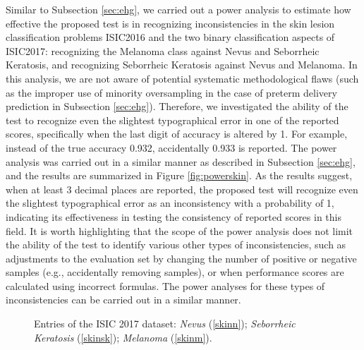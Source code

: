 \documentclass[3p, times]{elsarticle}
\begin{document}
Similar to Subsection \ref{sec:ehg}, we carried out a power analysis to estimate how effective the proposed test is in recognizing inconsistencies in the skin lesion classification problems ISIC2016 and the two binary classification aspects of ISIC2017: recognizing the Melanoma class against Nevus and Seborrheic Keratosis, and recognizing Seborrheic Keratosis against Nevus and Melanoma. In this analysis, we are not aware of potential systematic methodological flaws (such as the improper use of minority oversampling in the case of preterm delivery prediction in Subsection \ref{sec:ehg}). Therefore, we investigated the ability of the test to recognize even the slightest typographical error in one of the reported scores, specifically when the last digit of accuracy is altered by 1. For example, instead of the true accuracy 0.932, accidentally 0.933 is reported. The power analysis was carried out in a similar manner as described in Subsection \ref{sec:ehg}, and the results are summarized in Figure \ref{fig:powerskin}. As the results suggest, when at least 3 decimal places are reported, the proposed test will recognize even the slightest typographical error as an inconsistency with a probability of 1, indicating its effectiveness in testing the consistency of reported scores in this field. It is worth highlighting that the scope of the power analysis does not limit the ability of the test to identify various other types of inconsistencies, such as adjustments to the evaluation set by changing the number of positive or negative samples (e.g., accidentally removing samples), or when performance scores are calculated using incorrect formulas. The power analyses for these types of inconsistencies can be carried out in a similar manner.


\begin{figure}[t]
\begin{center}
\end{center}
\caption{Entries of the ISIC 2017 \cite{isic2017} dataset: \emph{Nevus} (\ref{skinn}); \emph{Seborrheic Keratosis} (\ref{skinsk}); \emph{Melanoma} (\ref{skinm}).}
\label{figskin}
\end{figure}
\end{document}
